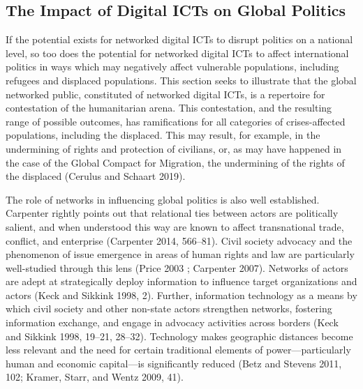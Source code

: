 \hypertarget{the-impact-of-digital-icts-on-global-politics}{%
\subsection{The Impact of Digital ICTs on Global
Politics}\label{the-impact-of-digital-icts-on-global-politics}}

If the potential exists for networked digital ICTs to disrupt politics
on a national level, so too does the potential for networked digital
ICTs to affect international politics in ways which may negatively
affect vulnerable populations, including refugees and displaced
populations. This section seeks to illustrate that the global networked
public, constituted of networked digital ICTs, is a repertoire for
contestation of the humanitarian arena. This contestation, and the
resulting range of possible outcomes, has ramifications for all
categories of crises-affected populations, including the displaced. This
may result, for example, in the undermining of rights and protection of
civilians, or, as may have happened in the case of the Global Compact
for Migration, the undermining of the rights of the displaced (Cerulus
and Schaart 2019).

The role of networks in influencing global politics is also well
established. Carpenter rightly points out that relational ties between
actors are politically salient, and when understood this way are known
to affect transnational trade, conflict, and enterprise (Carpenter 2014,
566--81). Civil society advocacy and the phenomenon of issue emergence
in areas of human rights and law are particularly well-studied through
this lens (Price 2003 ; Carpenter 2007). Networks of actors are adept at
strategically deploy information to influence target organizations and
actors (Keck and Sikkink 1998, 2). Further, information technology as a
means by which civil society and other non-state actors strengthen
networks, fostering information exchange, and engage in advocacy
activities across borders (Keck and Sikkink 1998, 19--21, 28--32).
Technology makes geographic distances become less relevant and the need
for certain traditional elements of power---particularly human and
economic capital---is significantly reduced (Betz and Stevens 2011, 102;
Kramer, Starr, and Wentz 2009, 41).

